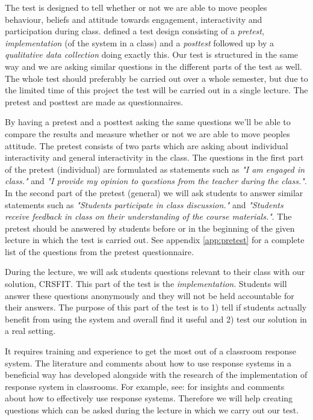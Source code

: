 The test is designed to tell whether or not we are able to move peoples behaviour, beliefs and attitude towards engagement, interactivity and participation during class.  defined a test design consisting of a \emph{pretest}, \emph{implementation} (of the system in a class) and a \emph{posttest} followed up by a \emph{qualitative data collection} doing exactly this. Our test is structured in the same way and we are asking similar questions in the different parts of the test as well. The whole test should preferably be carried out over a whole semester, but due to the limited time of this project the test will be carried out in a single lecture. The pretest and posttest are made as questionnaires. 

By having a pretest and a posttest asking the same questions we'll be able to compare the results and measure whether or not we are able to move peoples attitude. The pretest consists of two parts which are asking about individual interactivity and general interactivity in the class. The questions in the first part of the pretest (individual) are formulated as statements such as \emph{"I am engaged in class."} and \emph{"I provide my opinion to questions from the teacher during the class."}. In the second part of the pretest (general) we will ask students to answer similar statements such as \emph{"Students participate in class discussion."} and \emph{"Students receive feedback in class on their understanding of the course materials."}. The pretest should be answered by students before or in the beginning of the given lecture in which the test is carried out. See appendix \ref{app:pretest} for a complete list of the questions from the pretest questionnaire.

During the lecture, we will ask students questions relevant to their class with our solution, CRSFIT. This part of the test is the \emph{implementation}. Students will answer these questions anonymously and they will not be held accountable for their answers. The purpose of this part of the test is to 1) tell if students actually benefit from using the system and overall find it useful and 2) test our solution in a real setting.

It requires training and experience to get the most out of a classroom response system. The literature and comments about how to use response systems in a beneficial way has developed alongside with the research of the implementation of response system in classrooms. For example, see: \cite{lantz2014effectiveness,draper2004increasing,lin2011implementing} for insights and comments about how to effectively use response systems. Therefore we will help creating questions which can be asked during the lecture in which we carry out our test.

